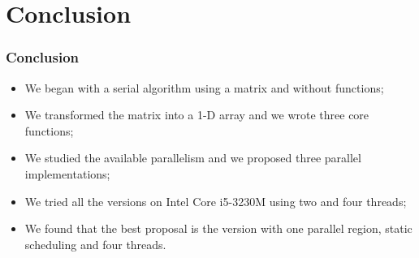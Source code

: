 \documentclass{beamer}
\begin{document}
\section{Conclusion}
\begin{frame}
	\frametitle{Conclusion}
	\begin{itemize}
		\item We began with a serial algorithm using a matrix and without functions;
		\item We transformed the matrix into a 1-D array and we wrote three core functions;
		\item We studied the available parallelism and we proposed three parallel implementations;
		\item We tried all the versions on Intel Core i5-3230M using two and four threads;
		\item We found that the best proposal is the version with one parallel region, static scheduling and four threads.
	\end{itemize}
\end{frame}
\end{document}
